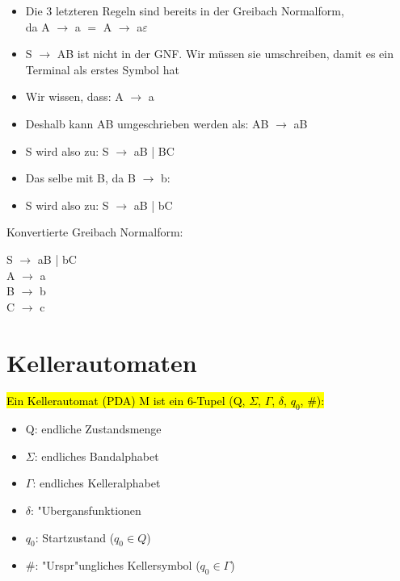\documentclass[11pt, a4paper]{scrartcl}
\begin{document}
\vspace{0.5em}

\begin{itemize}
    \item Die 3 letzteren Regeln sind bereits in der Greibach Normalform,\\ da A $\rightarrow$ a $=$ A $\rightarrow$ a$\varepsilon$
    \item S $\rightarrow$ AB ist nicht in der GNF. Wir müssen sie umschreiben, damit es ein Terminal als erstes Symbol hat
    \item Wir wissen, dass: A $\rightarrow$ a 
    \item Deshalb kann AB umgeschrieben werden als: AB $\rightarrow$ aB
    \item S wird also zu: S $\rightarrow$ aB | BC
    \item Das selbe mit B, da B $\rightarrow$ b:
    \item S wird also zu: S $\rightarrow$ aB | bC
\end{itemize}

Konvertierte Greibach Normalform:

S $\rightarrow$ aB | bC \\
A $\rightarrow$ a \\
B $\rightarrow$ b \\
C $\rightarrow$ c \\





\newpage


\section{Kellerautomaten}

\hl{Ein Kellerautomat (PDA) M ist ein 6-Tupel (Q, $\Sigma$, $\Gamma$, $\delta$, $q_0$, $\#$):}

\begin{itemize}
    \item Q: endliche Zustandsmenge
    \item $\Sigma$: endliches Bandalphabet
    \item $\Gamma$: endliches Kelleralphabet
    \item $\delta$: "Ubergansfunktionen
    \item $q_0$: Startzustand ($q_0 \in Q$)
    \item $\#$: "Urspr"ungliches Kellersymbol ($q_0 \in \Gamma$)
\end{itemize}
\end{document}
